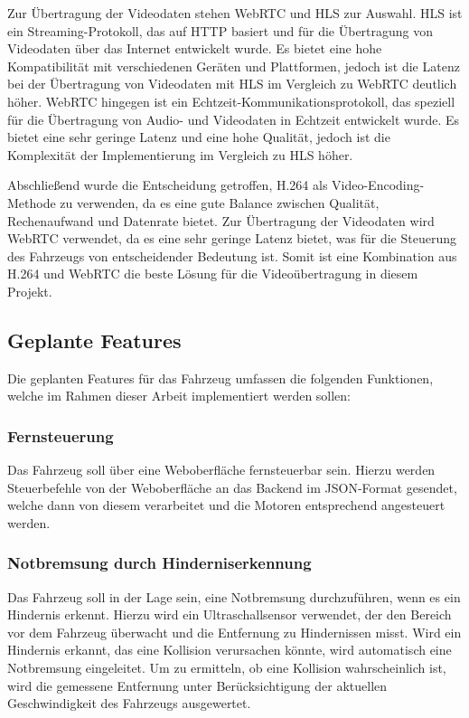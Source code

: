     Zur Übertragung der Videodaten stehen \ac{WebRTC} und \ac{HLS} zur Auswahl. \ac{HLS} ist ein Streaming-Protokoll, das auf \ac{HTTP} basiert und für die Übertragung von Videodaten über das Internet entwickelt wurde. Es bietet eine hohe Kompatibilität mit verschiedenen Geräten und Plattformen, jedoch ist die Latenz bei der Übertragung von Videodaten mit \ac{HLS} im Vergleich zu \ac{WebRTC} deutlich höher. \ac{WebRTC} hingegen ist ein Echtzeit-Kommunikationsprotokoll, das speziell für die Übertragung von Audio- und Videodaten in Echtzeit entwickelt wurde. Es bietet eine sehr geringe Latenz und eine hohe Qualität, jedoch ist die Komplexität der Implementierung im Vergleich zu \ac{HLS} höher.

    Abschließend wurde die Entscheidung getroffen, H.264 als Video-Encoding-Methode zu verwenden, da es eine gute Balance zwischen Qualität, Rechenaufwand und Datenrate bietet. Zur Übertragung der Videodaten wird \ac{WebRTC} verwendet, da es eine sehr geringe Latenz bietet, was für die Steuerung des Fahrzeugs von entscheidender Bedeutung ist. Somit ist eine Kombination aus H.264 und \ac{WebRTC} die beste Lösung für die Videoübertragung in diesem Projekt.
    
    
    \subsection{Geplante Features} %
    Die geplanten Features für das Fahrzeug umfassen die folgenden Funktionen, welche im Rahmen dieser Arbeit implementiert werden sollen:
    
        \subsubsection{Fernsteuerung}
        Das Fahrzeug soll über eine Weboberfläche fernsteuerbar sein. Hierzu werden Steuerbefehle von der Weboberfläche an das Backend im \ac{JSON}-Format gesendet, welche dann von diesem verarbeitet und die Motoren entsprechend angesteuert werden.

        \subsubsection{Notbremsung durch Hinderniserkennung}
        Das Fahrzeug soll in der Lage sein, eine Notbremsung durchzuführen, wenn es ein Hindernis erkennt. Hierzu wird ein Ultraschallsensor verwendet, der den Bereich vor dem Fahrzeug überwacht und die Entfernung zu Hindernissen misst. Wird ein Hindernis erkannt, das eine Kollision verursachen könnte, wird automatisch eine Notbremsung eingeleitet. Um zu ermitteln, ob eine Kollision wahrscheinlich ist, wird die gemessene Entfernung unter Berücksichtigung der aktuellen Geschwindigkeit des Fahrzeugs ausgewertet. 
        
